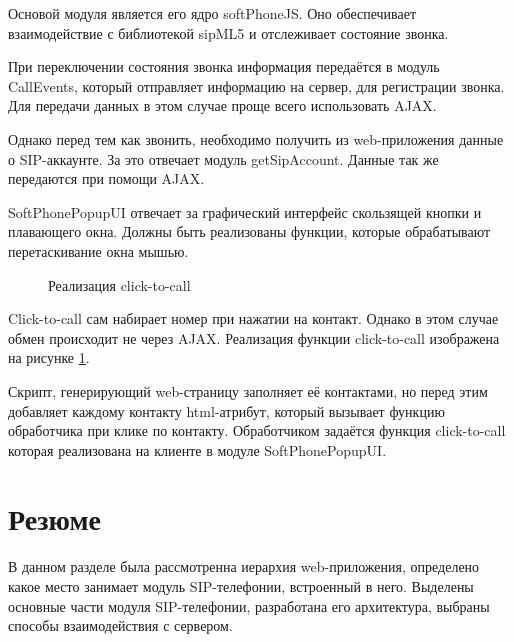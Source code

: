 Основой модуля является его ядро softPhoneJS. Оно обеспечивает взаимодействие с библиотекой sipML5 и отслеживает состояние звонка.

При переключении состояния звонка информация передаётся в модуль CallEvents, который отправляет информацию на сервер, для регистрации звонка. Для передачи данных в этом случае проще всего использовать AJAX.

Однако перед тем как звонить, необходимо получить из web-приложения данные о SIP-аккаунте. За это отвечает модуль getSipAccount. Данные так же передаются при помощи AJAX.

SoftPhonePopupUI отвечает за графический интерфейс скользящей кнопки и плавающего окна. Должны быть реализованы функции, которые обрабатывают перетаскивание окна мышью.

\begin{figure}[h!]
\caption{Реализация click-to-call}
\label{image:ClickToCall}
\end{figure}

Click-to-call сам набирает номер при нажатии на контакт. Однако в этом случае обмен происходит не через AJAX. Реализация функции click-to-call изображена на рисунке \ref{image:ClickToCall}.

Скрипт, генерирующий web-страницу заполняет её контактами, но перед этим добавляет каждому контакту html-атрибут, который вызывает функцию обработчика при клике по контакту. Обработчиком задаётся функция click-to-call которая реализована на клиенте в модуле SoftPhonePopupUI.

\section{Резюме}

В данном разделе была рассмотренна иерархия web-приложения, определено какое место занимает модуль SIP-телефонии, встроенный в него. Выделены основные части модуля SIP-телефонии, разработана его архитектура, выбраны способы взаимодействия с сервером.
